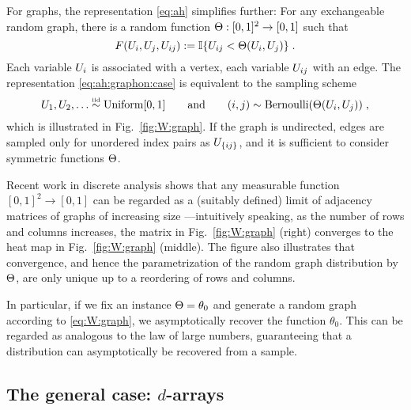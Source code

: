 For graphs, the representation \eqref{eq:ah} simplifies further:
For any exchangeable random graph, there is a random
function ${\Theta:[0,1]^2\rightarrow[0,1]}$ such that
\begin{equation}
  \label{eq:ah:graphon:case}
  F(U_i,U_j,U_{ij}):=\mathbb{I}\lbrace U_{ij} < \Theta(U_i,U_j)\rbrace\;.
\end{equation}
Each variable $U_i$ is associated with a vertex, each variable $U_{ij}$ with an edge. 
The representation \eqref{eq:ah:graphon:case} is equivalent to the sampling scheme
\begin{equation}
  \label{eq:W:graph}
  U_1,U_2,\dots\overset{\mbox{\tiny iid}}{\sim}\mbox{\rm Uniform}[0,1]\qquad\text{and}\qquad (i,j)\sim\mbox{\rm Bernoulli}(\Theta(U_i,U_j))\;,
\end{equation}
which is illustrated in Fig.~\ref{fig:W:graph}. If the graph is undirected, edges are sampled only for unordered index pairs as $U_{\lbrace ij\rbrace}$,
and it is sufficient to consider symmetric functions $\Theta$.

Recent work in discrete analysis shows that any
measurable function $[0,1]^2\rightarrow[0,1]$ can be regarded as a (suitably defined) limit of adjacency matrices
of graphs of increasing size \citep{Lovasz:Szegedy:2006}---intuitively speaking, 
as the number of rows and columns increases, the
matrix in Fig.~\ref{fig:W:graph} (right) converges to the heat map in Fig.~\ref{fig:W:graph} (middle).
The figure also illustrates that convergence, and hence the parametrization of the random graph distribution
by $\Theta$, are only unique up to a reordering of rows and columns.

In particular, if we fix an instance ${\Theta=\theta_0}$ and generate a random graph according to \eqref{eq:W:graph},
we asymptotically recover the function $\theta_0$. This can be regarded as analogous to the law of large
numbers, guaranteeing that a distribution can asymptotically be recovered from a sample.

\subsection{The general case: $d$-arrays}


